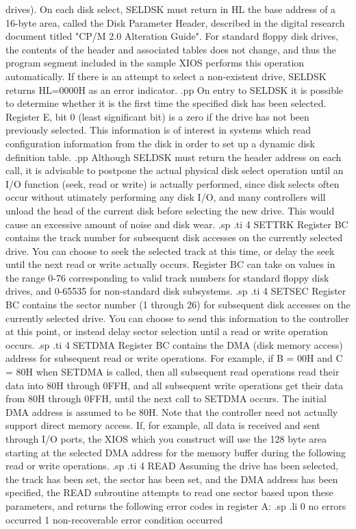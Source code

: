 drives).
On each disk select, SELDSK must return in HL the base address of a
16-byte area, called the Disk Parameter Header, described in
the digital research document titled "CP/M 2.0 Alteration Guide".
For standard floppy disk drives, the
contents of the header and associated tables does not change,
and thus the program segment included in the sample XIOS
performs this operation automatically.  If there is an attempt
to select a non-existent drive, SELDSK returns HL=0000H as
an error indicator.
.pp
On  entry to SELDSK it is possible to determine whether  it
is  the  first time the specified disk has  been  selected.
Register E, bit 0 (least significant bit) is a zero if the
drive  has not been previously selected.  This information
is  of  interest in systems which read  configuration
information  from  the disk in order to set up  a  dynamic
disk definition table.
.pp
Although SELDSK must return the header
address on each call, it is
advisable to postpone the actual physical disk select operation until an I/O
function (seek, read or write) is actually performed, since disk
selects often occur without utimately performing any disk I/O, and
many controllers will unload the head of the current disk before
selecting the new drive.  This would cause an excessive amount of
noise and disk wear.
.sp
.ti 4
SETTRK      Register BC contains the track number for subsequent disk
accesses on the currently selected drive.  You can choose to seek the
selected track at this time, or delay the seek until the next read or
write actually occurs.  Register BC can take on values in the range
0-76 corresponding to valid track numbers
for standard floppy disk drives, and 0-65535 for non-standard
disk subsystems.
.sp
.ti 4
SETSEC      Register BC contains the sector number (1 through 26) for
subsequent disk accesses on the currently selected drive.  You can
choose to send this information to the controller at this point, or
instead delay sector selection until a read or write operation occurs.
.sp
.ti 4
SETDMA      Register BC contains the DMA (disk memory access) address for
subsequent  read or write operations.  For example, if B = 00H and C
= 80H when SETDMA is called, then all subsequent read operations read
their data into 80H through 0FFH, and all subsequent write operations
get their data from 80H through 0FFH, until the next call to SETDMA
occurs.  The initial DMA address is assumed to be 80H.  Note that the
controller need not actually support direct memory access.  If, for
example, all data is received and sent through I/O ports, the XIOS
which you construct will use the 128 byte area starting at the
selected DMA address for the memory buffer during the following read
or write operations.
.sp
.ti 4
READ        Assuming the drive has been selected, the track has been
set, the sector has been set, and the DMA address has been
specified, the READ subroutine attempts to read one sector based
upon these parameters, and returns the following error codes in
register A:
.sp
.li
                 0      no errors occurred
                 1      non-recoverable error condition occurred

